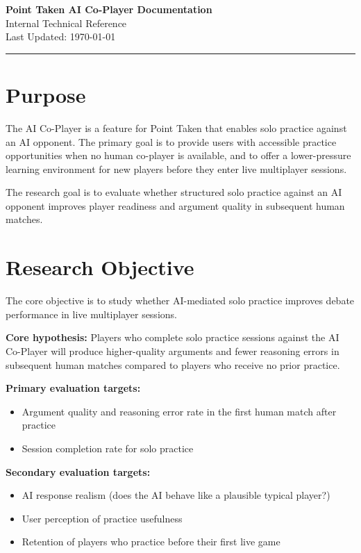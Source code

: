 \documentclass[11pt]{article}
\begin{document}
\begin{center}
  {\LARGE \textbf{Point Taken AI Co-Player Documentation}} \\[0.5em]
  {\normalsize Internal Technical Reference} \\[0.2em]
  {Last Updated: \small \today}
\end{center}

\vspace{0.5em}
\hrule
\vspace{1.5em}

\section{Purpose}

The AI Co-Player is a feature for Point Taken that enables solo practice against an AI
opponent. The primary goal is to provide users with accessible practice opportunities when no
human co-player is available, and to offer a lower-pressure learning environment for new players
before they enter live multiplayer sessions.

The research goal is to evaluate whether structured solo practice against an AI opponent
improves player readiness and argument quality in subsequent human matches.

\section{Research Objective}

The core objective is to study whether AI-mediated solo practice improves debate performance
in live multiplayer sessions.

\textbf{Core hypothesis:} Players who complete solo practice sessions against the AI Co-Player
will produce higher-quality arguments and fewer reasoning errors in subsequent human matches
compared to players who receive no prior practice.

\textbf{Primary evaluation targets:}
\begin{itemize}
  \item Argument quality and reasoning error rate in the first human match after practice
  \item Session completion rate for solo practice
\end{itemize}

\textbf{Secondary evaluation targets:}
\begin{itemize}
  \item AI response realism (does the AI behave like a plausible typical player?)
  \item User perception of practice usefulness
  \item Retention of players who practice before their first live game
\end{itemize}
\end{document}
